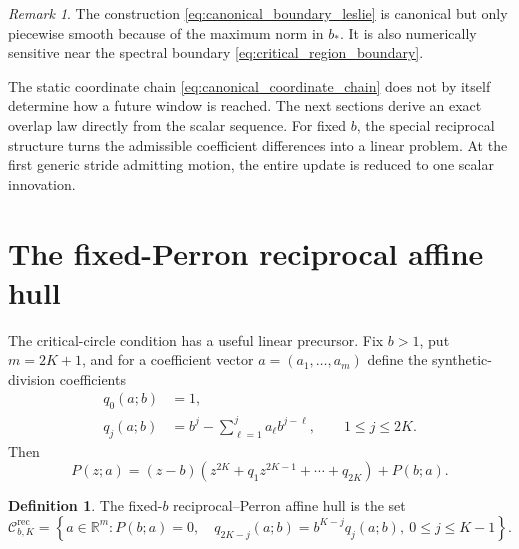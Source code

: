 \documentclass[11pt]{amsart}
\numberwithin{equation}{section}
\theoremstyle{plain}
\theoremstyle{definition}
\newtheorem{definition}[theorem]{Definition}
\theoremstyle{remark}
\newtheorem{remark}[theorem]{Remark}
\begin{document}
\begin{remark}
\label{rem:canonical_not_smooth_everywhere}
The construction \eqref{eq:canonical_boundary_leslie} is canonical but only piecewise smooth because of the maximum norm in $b_*$.  It is also numerically sensitive near the spectral boundary \eqref{eq:critical_region_boundary}.
\end{remark}

The static coordinate chain \eqref{eq:canonical_coordinate_chain} does not by itself determine how a future window is reached.  The next sections derive an exact overlap law directly from the scalar sequence.  For fixed $b$, the special reciprocal structure turns the admissible coefficient differences into a linear problem.  At the first generic stride admitting motion, the entire update is reduced to one scalar innovation.



\section{The fixed-Perron reciprocal affine hull}
\label{sec:reciprocal_affine_hull}

The critical-circle condition has a useful linear precursor.  Fix $b>1$, put $m=2K+1$, and for a coefficient vector $a=(a_1,\ldots,a_m)$ define the synthetic-division coefficients
\begin{align}
q_0(a;b)&=1,
\label{eq:q_zero}\\
q_j(a;b)&=b^j-\sum_{\ell=1}^{j}a_\ell b^{j-\ell},
\qquad 1\leq j\leq 2K.
\label{eq:q_definition}
\end{align}
Then
\begin{equation}
P(z;a)
=(z-b)\left(
 z^{2K}+q_1z^{2K-1}+\cdots+q_{2K}
\right)+P(b;a).
\label{eq:synthetic_division_identity}
\end{equation}

\begin{definition}
\label{def:reciprocal_perron_hull}
The fixed-$b$ reciprocal--Perron affine hull is the set
\begin{equation}
\mathcal C^{\mathrm{rec}}_{b,K}
=
\left\{
a\in\mathbb R^m:
P(b;a)=0,
\quad
q_{2K-j}(a;b)=b^{K-j}q_j(a;b),\ 0\leq j\leq K-1
\right\}.
\label{eq:reciprocal_perron_hull}
\end{equation}
\end{definition}
\end{document}
